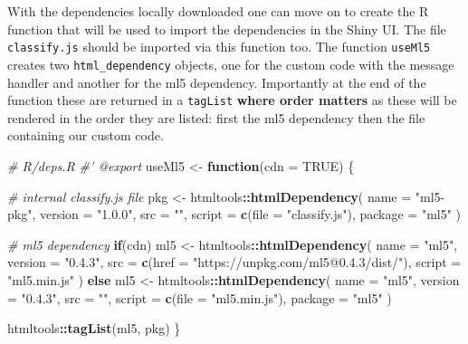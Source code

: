 \documentclass[10pt,]{krantz}
\makeatletter
\newenvironment{Shaded}{\begin{snugshade}}{\end{snugshade}}
\newcommand{\CommentTok}[1]{\textcolor[rgb]{0.37,0.37,0.37}{\textit{#1}}}
\newcommand{\ControlFlowTok}[1]{\textcolor[rgb]{0.27,0.27,0.27}{\textbf{#1}}}
\newcommand{\DataTypeTok}[1]{\textcolor[rgb]{0.27,0.27,0.27}{#1}}
\newcommand{\KeywordTok}[1]{\textcolor[rgb]{0.27,0.27,0.27}{\textbf{#1}}}
\newcommand{\NormalTok}[1]{#1}
\newcommand{\OperatorTok}[1]{\textcolor[rgb]{0.43,0.43,0.43}{\textbf{#1}}}
\newcommand{\OtherTok}[1]{\textcolor[rgb]{0.37,0.37,0.37}{#1}}
\newcommand{\StringTok}[1]{\textcolor[rgb]{0.5,0.5,0.5}{#1}}
\newenvironment{kframe}{%
\medskip{}
\setlength{\fboxsep}{.8em}
 \def\at@end@of@kframe{}%
 \ifinner\ifhmode%
  \def\at@end@of@kframe{\end{minipage}}%
  \begin{minipage}{\columnwidth}%
 \fi\fi%
 \def\FrameCommand##1{\hskip\@totalleftmargin \hskip-\fboxsep
 \colorbox{shadecolor}{##1}\hskip-\fboxsep
     \hskip-\linewidth \hskip-\@totalleftmargin \hskip\columnwidth}%
 \MakeFramed {\advance\hsize-\width
   \@totalleftmargin\z@ \linewidth\hsize
   \@setminipage}}%
 {\par\unskip\endMakeFramed%
 \at@end@of@kframe}
\renewenvironment{Shaded}{\begin{kframe}}{\end{kframe}}
\makeatother
\begin{document}
With the dependencies locally downloaded one can move on to create the R function that will be used to import the dependencies in the Shiny UI. The file \texttt{classify.js} should be imported via this function too. The function \texttt{useMl5} creates two \texttt{html\_dependency} objects, one for the custom code with the message handler and another for the ml5 dependency. Importantly at the end of the function these are returned in a \texttt{tagList} \textbf{where order matters} as these will be rendered in the order they are listed: first the ml5 dependency then the file containing our custom code.

\begin{Shaded}
\begin{Highlighting}[]
\CommentTok{# R/deps.R}
\CommentTok{#' @export}
\NormalTok{useMl5 <-}\StringTok{ }\ControlFlowTok{function}\NormalTok{(}\DataTypeTok{cdn =} \OtherTok{TRUE}\NormalTok{) \{}

  \CommentTok{# internal classify.js file}
\NormalTok{  pkg <-}\StringTok{ }\NormalTok{htmltools}\OperatorTok{::}\KeywordTok{htmlDependency}\NormalTok{(}
    \DataTypeTok{name =} \StringTok{"ml5-pkg"}\NormalTok{,}
    \DataTypeTok{version =} \StringTok{"1.0.0"}\NormalTok{,}
    \DataTypeTok{src =} \StringTok{""}\NormalTok{,}
    \DataTypeTok{script =} \KeywordTok{c}\NormalTok{(}\DataTypeTok{file =} \StringTok{"classify.js"}\NormalTok{),}
    \DataTypeTok{package =} \StringTok{"ml5"}
\NormalTok{  )}

  \CommentTok{# ml5 dependency}
  \ControlFlowTok{if}\NormalTok{(cdn)}
\NormalTok{    ml5 <-}\StringTok{ }\NormalTok{htmltools}\OperatorTok{::}\KeywordTok{htmlDependency}\NormalTok{(}
      \DataTypeTok{name =} \StringTok{"ml5"}\NormalTok{,}
      \DataTypeTok{version =} \StringTok{"0.4.3"}\NormalTok{,}
      \DataTypeTok{src =} \KeywordTok{c}\NormalTok{(}\DataTypeTok{href =} \StringTok{"https://unpkg.com/ml5@0.4.3/dist/"}\NormalTok{),}
      \DataTypeTok{script =} \StringTok{"ml5.min.js"}
\NormalTok{    )}
  \ControlFlowTok{else} 
\NormalTok{    ml5 <-}\StringTok{ }\NormalTok{htmltools}\OperatorTok{::}\KeywordTok{htmlDependency}\NormalTok{(}
      \DataTypeTok{name =} \StringTok{"ml5"}\NormalTok{,}
      \DataTypeTok{version =} \StringTok{"0.4.3"}\NormalTok{,}
      \DataTypeTok{src =} \StringTok{""}\NormalTok{,}
      \DataTypeTok{script =} \KeywordTok{c}\NormalTok{(}\DataTypeTok{file =} \StringTok{"ml5.min.js"}\NormalTok{),}
      \DataTypeTok{package =} \StringTok{"ml5"}
\NormalTok{    )}

\NormalTok{  htmltools}\OperatorTok{::}\KeywordTok{tagList}\NormalTok{(ml5, pkg)}
\NormalTok{\}}
\end{Highlighting}
\end{Shaded}
\end{document}
